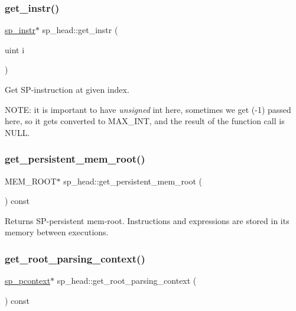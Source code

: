\subsubsection{\texorpdfstring{get\+\_\+instr()}{get\_instr()}}
{\footnotesize\ttfamily \mbox{\hyperlink{classsp__instr}{sp\+\_\+instr}}$\ast$ sp\+\_\+head\+::get\+\_\+instr (\begin{DoxyParamCaption}\item[{uint}]{i }\end{DoxyParamCaption})\hspace{0.3cm}{\ttfamily [inline]}}

Get SP-\/instruction at given index.

N\+O\+TE\+: it is important to have {\itshape unsigned} int here, sometimes we get (-\/1) passed here, so it get\textquotesingle{}s converted to M\+A\+X\+\_\+\+I\+NT, and the result of the function call is N\+U\+LL. \mbox{\label{classsp__head_a0a505191b322f3bb15699f83fe69330b}} 
\subsubsection{\texorpdfstring{get\+\_\+persistent\+\_\+mem\+\_\+root()}{get\_persistent\_mem\_root()}}
{\footnotesize\ttfamily M\+E\+M\+\_\+\+R\+O\+OT$\ast$ sp\+\_\+head\+::get\+\_\+persistent\+\_\+mem\+\_\+root (\begin{DoxyParamCaption}{ }\end{DoxyParamCaption}) const\hspace{0.3cm}{\ttfamily [inline]}}

\begin{DoxyReturn}{Returns}
SP-\/persistent mem-\/root. Instructions and expressions are stored in its memory between executions. 
\end{DoxyReturn}
\mbox{\label{classsp__head_ae36e4506a4d63fef79403721a4739907}} 
\subsubsection{\texorpdfstring{get\+\_\+root\+\_\+parsing\+\_\+context()}{get\_root\_parsing\_context()}}
{\footnotesize\ttfamily \mbox{\hyperlink{classsp__pcontext}{sp\+\_\+pcontext}}$\ast$ sp\+\_\+head\+::get\+\_\+root\+\_\+parsing\+\_\+context (\begin{DoxyParamCaption}{ }\end{DoxyParamCaption}) const\hspace{0.3cm}{\ttfamily [inline]}}

